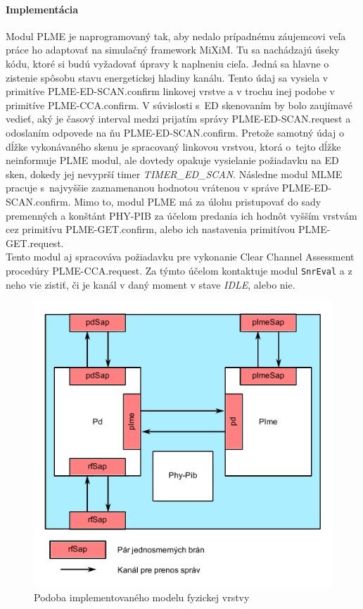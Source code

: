 \paragraph{Implementácia}
Modul PLME je naprogramovaný tak, aby nedalo prípadnému záujemcovi veľa práce ho adaptovať na simulačný framework MiXiM. Tu sa nachádzajú úseky kódu, ktoré si budú vyžadovať úpravy k naplneniu cieľa. Jedná sa hlavne o zistenie spôsobu stavu energetickej hladiny kanálu. Tento údaj sa vysiela v primitíve PLME-ED-SCAN.confirm linkovej vrstve a v trochu inej podobe v primitíve PLME-CCA.confirm. V súvislosti s~ED skenovaním by bolo zaujímavé vedieť, aký je časový interval medzi prijatím správy PLME-ED-SCAN.request a odoslaním odpovede na ňu PLME-ED-SCAN.confirm. Pretože samotný údaj o dĺžke vykonávaného skenu je spracovaný linkovou vrstvou, ktorá o~tejto dĺžke neinformuje PLME modul, ale dovtedy opakuje vysielanie požiadavku na ED sken, dokedy jej nevyprší timer \textit{TIMER\_ED\_SCAN}. Následne modul MLME pracuje s~najvyššie zaznamenanou hodnotou vrátenou v správe PLME-ED-SCAN.confirm. Mimo to, modul PLME má za úlohu pristupovať do sady premenných a konštánt PHY-PIB za účelom predania ich hodnôt vyšším vrstvám cez primitívu PLME-GET.confirm, alebo ich nastavenia primitívou PLME-GET.request.\\
\indent Tento modul aj spracováva požiadavku pre vykonanie Clear Channel Assessment procedúry PLME-CCA.request. Za týmto účelom kontaktuje modul \texttt{SnrEval} a z neho vie zistiť, či je kanál v daný moment v stave \textit{IDLE}, alebo nie.\\
\begin{figure}[htbp]
\begin{center}
\includegraphics[width=120mm]{figures/architecture_phy}
\caption{Podoba implementovaného modelu fyzickej vrstvy}
\label{fig:architecture_phy}
\end{center}
\end{figure}
